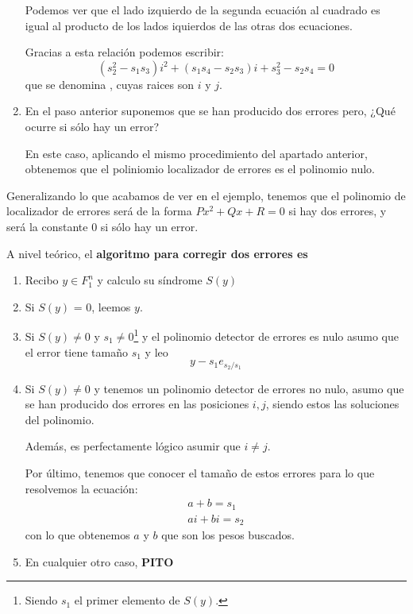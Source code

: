 \begin{example}
\begin{enumerate}
Podemos ver que el lado izquierdo de la segunda ecuación al cuadrado es igual al producto de los lados iquierdos de las otras dos ecuaciones.

Gracias a esta relación podemos escribir:
\[(s_2^2-s_1s_3)i^2+(s_1s_4-s_2s_3)i+s_3^2-s_2s_4=0\]
que se denomina , cuyas raices son $i$ y $j$.

\item En el paso anterior suponemos que se han producido dos errores pero, ¿Qué ocurre si sólo hay un error?

En este caso, aplicando el mismo procedimiento del apartado anterior, obtenemos que el poliniomio localizador de errores es el polinomio nulo.

\end{enumerate}
\end{example}

Generalizando lo que acabamos de ver en el ejemplo, tenemos que el polinomio de localizador de errores será de la forma $Px^2+Qx+R=0$ si hay dos errores, y será la constante $0$ si sólo hay un error.

A nivel teórico, el \textbf{algoritmo para corregir dos errores es}
\begin{enumerate}
\item Recibo $y\in F_1^n$ y calculo su síndrome $S(y)$
\item Si $S(y)$ = 0, leemos $y$.
\item Si $S(y) \neq 0$ y $s_1\neq 0$\footnote{Siendo $s_1$ el primer elemento de $S(y)$.} y el polinomio detector de errores es nulo asumo que el error tiene tamaño $s_1$ y leo
\[y-s_1e_{s_2/s_1}\]

\item Si $S(y) \neq 0$ y tenemos un polinomio detector de errores no nulo, asumo que se han producido dos errores en las posiciones $i,j$, siendo estos las soluciones del polinomio.

Además, es perfectamente lógico asumir que $i\neq j$.

Por último, tenemos que conocer el tamaño de estos errores para lo que resolvemos la ecuación:
\[\begin{array}{l}
a+b=s_1\\
ai+bi=s_2\end{array}\]
con lo que obtenemos $a$ y $b$ que son los pesos buscados.

\item En cualquier otro caso, \textbf{PITO}
\end{enumerate}

